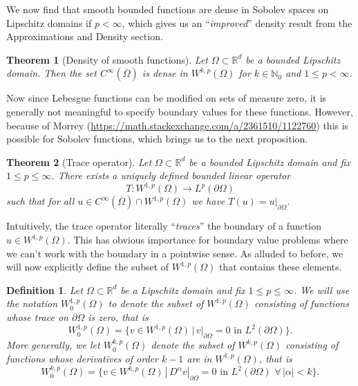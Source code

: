 \documentclass[11pt]{article}
\newtheorem{theorem}{Theorem}
\newtheorem{definition}{Definition}
\theoremstyle{definition}
\begin{document}
We now find that smooth bounded functions are dense in Sobolev spaces on Lipschitz domains if $p < \infty$, which gives us
an ``\textit{improved}'' density result from the Approximations and Density section.

\begin{theorem}[Density of smooth functions]
	Let $\Omega \subset \mathbb{R}^d$ be a bounded Lipschitz domain. Then the set $C^{\infty}(\overline{\Omega})$ is dense
	in $W^{k,p}(\Omega)$ for $k \in \mathbb{N}_0$ and $1 \leq p < \infty$.
\end{theorem}

Now since Lebesgue functions can be modified on sets of measure zero, it is generally not meaningful to specify boundary values for these functions.
However, because of Morrey (\url{https://math.stackexchange.com/a/2361510/1122760}) this is possible for Sobolev functions, which brings us to the next proposition. 

\begin{theorem}[Trace operator]
	Let $\Omega \subset \mathbb{R}^d$ be a bounded Lipschitz domain and fix $1 \leq p \leq \infty$. There exists a uniquely defined bounded
	linear operator
	\begin{equation*}
		T : W^{1,p}(\Omega) \rightarrow L^p(\partial \Omega)
	\end{equation*}
	such that for all $u \in C^{\infty}(\overline{\Omega}) \cap W^{1,p}(\Omega)$ we have $T(u) = u|_{\partial \Omega}$.
\end{theorem}

Intuitively, the trace operator literally ``\textit{traces}'' the boundary of a function $u \in W^{1,p}(\Omega)$.
This has obvious importance for boundary value problems where we can't work with the boundary in a pointwise sense.
As alluded to before, we will now explicitly define the subset of $W^{1,p}(\Omega)$ that contains these elements.

\begin{definition}
	Let $\Omega \subset \mathbb{R}^d$ be a Lipschitz domain and fix $1 \leq p \leq \infty$.
	We will use the notation $W_{0}^{1,p}(\Omega)$ to denote the subset of $W^{1,p}(\Omega)$ consisting of functions whose
	trace on $\partial \Omega$ is zero, that is
	\begin{equation*}
		W_{0}^{1,p}(\Omega) = \{v \in W^{1,p}(\Omega) \, | \, v|_{\partial \Omega} = 0 \text{ in } L^2(\partial \Omega)\}.
	\end{equation*}
	More generally, we let $W_{0}^{k,p}(\Omega)$ denote the subset of $W^{k,p}(\Omega)$ consisting of functions whose
	derivatives of order $k-1$ are in $W^{1,p}(\Omega)$, that is
	\begin{equation*}
		W_{0}^{k,p}(\Omega) = \{v \in W^{k,p}(\Omega) \, | \, D^{\alpha}v|_{\partial \Omega} = 0 \text{ in } L^2(\partial \Omega) \,\, \forall \, |\alpha| < k\}.
	\end{equation*}
\end{definition}
\end{document}
